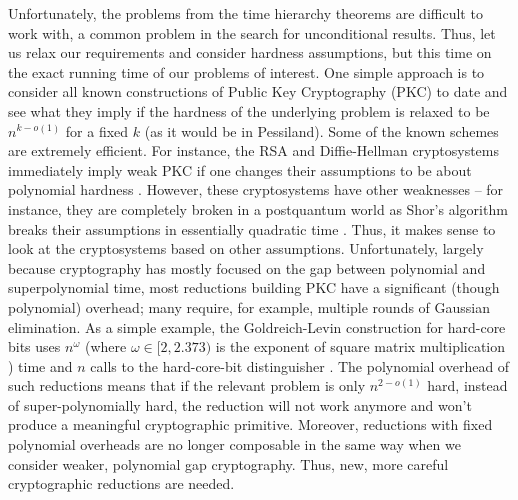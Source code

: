 Unfortunately, the problems from the time hierarchy theorems are difficult to work with, a common problem in the search for unconditional results. Thus, let us relax our requirements and consider hardness assumptions, but this time on the exact running time of our problems of interest. One simple approach is to consider all known constructions of Public Key Cryptography (PKC) to date and see what they imply if the hardness of the underlying problem is relaxed to be $n^{k-o(1)}$ for a fixed $k$ (as it would be in Pessiland). Some of the known schemes are extremely efficient. For instance, the RSA and Diffie-Hellman cryptosystems immediately imply weak PKC if one changes their assumptions to be about polynomial hardness \cite{rsa,DiffieHellman}. However, these cryptosystems have other weaknesses -- for instance, they are completely broken in a postquantum world as Shor's algorithm breaks their assumptions in essentially quadratic time \cite{Shor}. Thus, it makes sense to look at the cryptosystems based on other assumptions. Unfortunately, largely because cryptography has mostly focused on the gap between polynomial and superpolynomial time, most reductions building PKC have a significant (though polynomial) overhead; many require, for example, multiple rounds of Gaussian elimination. As a simple example,
the Goldreich-Levin  construction for hard-core bits uses $n^{\omega}$ (where $\omega\in [2,2.373)$ is the exponent of square matrix multiplication \cite{VVWmmfaster}\cite{legallMM}) time and $n$ calls to the hard-core-bit distinguisher \cite{hardCoreBitsAndXorLemmaFromGL}. The polynomial overhead of such reductions means that if the relevant problem is only $n^{2-o(1)}$ hard, instead of super-polynomially hard, the reduction will not work anymore and won't produce a meaningful cryptographic primitive. Moreover, reductions with fixed polynomial overheads are no longer composable in the same way when we consider weaker, polynomial gap cryptography. Thus, new, more careful cryptographic reductions are needed.

